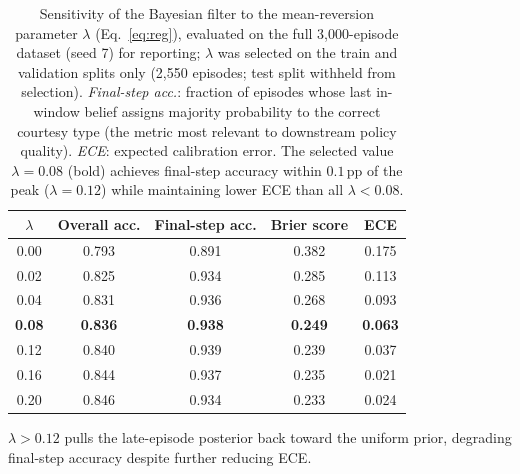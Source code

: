 \begin{table}[htbp]
\centering
\caption{Sensitivity of the Bayesian filter to the mean-reversion parameter
  $\lambda$ (Eq.~\eqref{eq:reg}), evaluated on the full 3{,}000-episode dataset
  (seed 7) for reporting; $\lambda$ was selected on the train and validation
  splits only (2{,}550 episodes; test split withheld from selection).
  \emph{Final-step acc.}: fraction of episodes whose last in-window belief
  assigns majority probability to the correct courtesy type
  (the metric most relevant to downstream policy quality).
  \emph{ECE}: expected calibration error.
  The selected value $\lambda{=}0.08$ (bold) achieves final-step accuracy within
  $0.1$\,pp of the peak ($\lambda{=}0.12$) while maintaining lower ECE than
  all $\lambda{<}0.08$.}
\label{tab:lambda_ablation}
\small
\begin{tabular}{ccccc}
\toprule
$\lambda$ & Overall acc. & Final-step acc. & Brier score & ECE \\
\midrule
0.00 & 0.793 & 0.891 & 0.382 & 0.175 \\
0.02 & 0.825 & 0.934 & 0.285 & 0.113 \\
0.04 & 0.831 & 0.936 & 0.268 & 0.093 \\
\textbf{0.08} & \textbf{0.836} & \textbf{0.938} & \textbf{0.249} & \textbf{0.063} \\
0.12 & 0.840 & 0.939 & 0.239 & 0.037 \\
0.16 & 0.844 & 0.937 & 0.235 & 0.021 \\
0.20 & 0.846 & 0.934 & 0.233 & 0.024 \\
\bottomrule
\end{tabular}
\begin{tablenotes}
\small
\item $\lambda{>}0.12$ pulls the late-episode posterior back toward the uniform
  prior, degrading final-step accuracy despite further reducing ECE.
\end{tablenotes}
\end{table}

